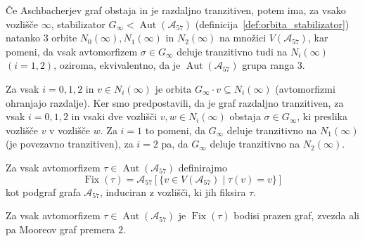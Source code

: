 \documentclass[fin1, tisk]{fmfdelo}
\newcommand{\asch}{\mathscr{A}_{57}}
\newcommand{\fix}{\operatorname{Fix}}
\newcommand{\aut}{\operatorname{Aut}}
\begin{document}

\begin{trditev}\label{tr:grupa_ranga_3}
    Če Aschbacherjev graf obstaja in je razdaljno tranzitiven, potem ima, za vsako vozlišče $\infty$,
    stabilizator $G_{\infty} < \aut(\asch)$ (definicija~\ref{def:orbita_stabilizator}) natanko $3$ orbite
    $N_0(\infty), N_1(\infty)$ in $N_2(\infty)$ na množici $V(\asch)$, kar pomeni, da vsak avtomorfizem
    $\sigma \in G_{\infty}$ deluje tranzitivno tudi na $N_i(\infty)$ $(i = 1, 2)$, oziroma, ekvivalentno, da je
    $\aut(\asch)$ grupa ranga $3$.
\end{trditev}

\begin{dokaz}
Za vsak $i=0,1,2$ in $v\in N_i(\infty)$ je orbita $G_{\infty}\cdot v \subseteq N_i(\infty)$ 
(avtomorfizmi ohranjajo razdalje). Ker smo predpostavili,
da je graf razdaljno tranzitiven,
za vsak $i=0,1,2$ in vsaki dve vozlišči $v, w \in N_i(\infty)$
obstaja $\sigma \in G_\infty$, ki preslika
vozlišče $v$ v vozlišče $w$.
Za $i=1$ to pomeni,
da $G_{\infty}$ deluje tranzitivno na $N_1(\infty)$ (je povezavno tranzitiven), 
za $i=2$ pa, da $G_{\infty}$ deluje tranzitivno na $N_2(\infty)$.
\end{dokaz}



\begin{definicija}
    Za vsak avtomorfizem $\tau \in \aut(\asch)$ definirajmo 
    $$\fix(\tau) = \asch[\{v \in V(\asch) \mid \tau(v) = v\}]$$ kot podgraf grafa $\asch$,
    induciran z vozlišči, ki jih fiksira $\tau$.
\end{definicija}


\begin{trditev}\label{tr:F_bodisi_zvezda_ali_moore}
    Za vsak avtomorfizem $\tau\in \aut(\asch)$ je 
    $\fix(\tau)$ bodisi prazen graf, zvezda ali pa Mooreov graf premera $2$.
\end{trditev}
\end{document}
